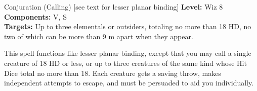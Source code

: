 {Conjuration (Calling) [see text for lesser planar binding]}
{
	\textbf{Level:}
	Wiz 8\\
	\textbf{Components:}
	V, S\\
	\textbf{Targets:}
	Up to three elementals or outsiders, totaling no more than 18 HD, no two of which can be more than 9 m apart when they appear.\\
}
{
	This spell functions like lesser planar binding, except that you may call a single creature of 18 HD or less, or up to three creatures of the same kind whose Hit Dice total no more than 18. Each creature gets a saving throw, makes independent attempts to escape, and must be persuaded to aid you individually.

}
